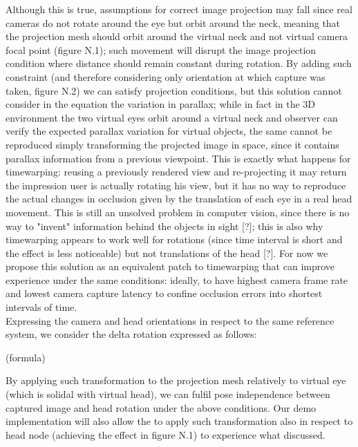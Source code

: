 Although this is true, assumptions for correct image projection may fall since real cameras do not rotate around the eye but orbit around the neck, meaning that the projection mesh should orbit around the virtual neck and not virtual camera focal point (figure N.1); such movement will disrupt the image projection condition where distance should remain constant during rotation. By adding such constraint (and therefore considering only orientation at which capture was taken, figure N.2) we can satisfy projection conditions, but this solution cannot consider in the equation the variation in parallax; while in fact in the 3D environment the two virtual eyes orbit around a virtual neck and observer can verify the expected parallax variation for virtual objects, the same cannot be reproduced simply transforming the projected image in space, since it contains parallax information from a previous viewpoint. This is exactly what happens for timewarping: reusing a previously rendered view and re-projecting it may return the impression user is actually rotating his view, but it has no way to reproduce the actual changes in occlusion given by the translation of each eye in a real head movement. This is still an unsolved problem in computer vision, since there is no way to "invent" information behind the objects in sight [?]; this is also why timewarping appears to work well for rotations (since time interval is short and the effect is less noticeable) but not translations of the head [?]. For now we propose this solution as an equivalent patch to timewarping that can improve experience under the same conditions: ideally, to have highest camera frame rate and lowest camera capture latency to confine occlusion errors into shortest intervals of time.\\
Expressing the camera and head orientations in respect to the same reference system, we consider the delta rotation expressed as follows:

(formula)

By applying such transformation to the projection mesh relatively to virtual eye (which is solidal with virtual head), we can fulfil pose independence between captured image and head rotation under the above conditions. Our demo implementation will also allow the to apply such transformation also in respect to head node (achieving the effect in figure N.1) to experience what discussed.


